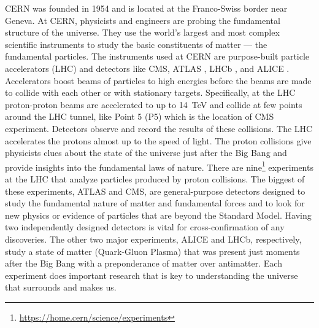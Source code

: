 CERN was founded in 1954 and is located at the Franco-Swiss border near Geneva. At CERN, physicists and engineers are probing the fundamental structure of the universe. They use the world's largest and most complex scientific instruments to study the basic constituents of matter --- the fundamental particles.
The instruments used at CERN are purpose-built particle accelerators (LHC) and detectors like CMS, ATLAS \cite{What_is_ATLAS}, LHCb \cite{What_is_LHCb}, and ALICE \cite{What_is_ALICE}. Accelerators boost beams of particles to high energies before the beams are made to collide with each other or with stationary targets. Specifically, at the LHC proton-proton beams are accelerated to up to 14~TeV and collide at few points around the LHC tunnel, like Point 5 (P5) which is the location of CMS experiment.
Detectors observe and record the results of these collisions.
The LHC accelerates the protons almost up to the speed of light.
The proton collisions give physicists clues about the state of the universe just after the Big Bang and provide insights into the fundamental laws of nature. There are nine\footnote{\url{https://home.cern/science/experiments}} experiments at the LHC that analyze particles produced by proton collisions.
The biggest of these experiments, ATLAS and CMS, are general-purpose detectors designed to study the fundamental nature of matter and fundamental forces and to look for new physics or evidence of particles that are beyond the Standard Model.
Having two independently designed detectors is vital for cross-confirmation of any discoveries. The other two major experiments, ALICE and LHCb, respectively, study a state of matter (Quark-Gluon Plasma) that was present just moments after the Big Bang with a preponderance of matter over antimatter. Each experiment does important research that is key to understanding the universe that surrounds and makes us.

